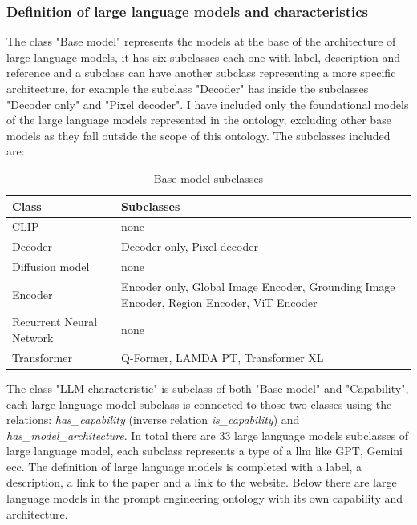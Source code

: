 \subsubsection{Definition of large language models and characteristics}

The class "Base model" represents the models at the base of the architecture of large language models, it has six subclasses each one with label, description and reference and a subclass can have another subclass representing a more specific architecture, for example the subclass "Decoder" has inside the subclasses "Decoder only" and "Pixel decoder". 
I have included only the foundational models of the large language models represented in the ontology, excluding other base models as they fall outside the scope of this ontology. The subclasses included are: 
\begin{table}[H]
    \centering
    \begin{tabular}{|>{\raggedright\arraybackslash}p{6cm}|>{\raggedright\arraybackslash}p{6cm}|}
        \hline
        \textbf{Class} & \textbf{Subclasses} \\ \hline
         CLIP & none \\ \hline
         
         Decoder & Decoder-only, Pixel decoder \\ \hline
         
         Diffusion model & none \\ \hline
         
         Encoder & Encoder only, Global Image Encoder, Grounding Image Encoder, Region Encoder, ViT Encoder \\ \hline
         
         Recurrent Neural Network & none \\ \hline

        Transformer & Q-Former, LAMDA PT, Transformer XL \\ \hline
    \end{tabular}
    \caption{Base model subclasses}
\end{table}
The class "LLM characteristic" is subclass of both "Base model" and "Capability", each large language model subclass is connected to those two classes using the relations: \textit{has\_capability} (inverse relation \textit{is\_capability}) and\\ \textit{has\_model\_architecture}. In total there are 33 large language models subclasses of large language model, each subclass represents a type of a llm like GPT, Gemini ecc. The definition of large language models is completed with a label, a description, a link to the paper and a link to the website. Below there are large language models in the prompt engineering ontology with its own capability and architecture.
